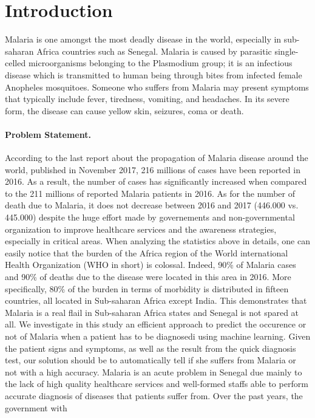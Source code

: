 \section{Introduction}\label{intro}
Malaria is one amongst the most deadly disease in the world, especially in sub-saharan Africa countries such as Senegal.
Malaria is caused by parasitic single-celled microorganisms belonging to the Plasmodium group; it is an infectious
disease which is transmitted to human being through bites from infected female Anopheles mosquitoes. Someone who suffers
from  Malaria may present symptoms that typically include fever, tiredness, vomiting, and headaches. In its severe form,
the disease can cause yellow skin, seizures, coma or death.
\paragraph*{Problem Statement.}
According to the last report about the propagation of Malaria disease around the world, published in November 2017, 216 millions of cases have been 
reported in 2016. As a result, the number of cases has significantly increased when compared to the 211 millions of reported Malaria patients in 2016.
As for the number of death due to Malaria, it does not decrease between 2016 and 2017 (446.000 vs. 445.000) despite the huge effort made by governements
and non-governmental organization to improve healthcare services and the awareness strategies, especially in critical areas. 
When analyzing the statistics above in details, one can easily notice that the burden of the Africa region of the World 
international Health Organization (WHO in short) is colossal. Indeed, 90\% of Malaria cases and 90\% of deaths due to the disease were located in this area in 2016.
More specifically, 80\% of the burden in terms of morbidity is distributed in fifteen countries, all located in Sub-saharan Africa except India. This demonstrates
that Malaria is a real flail in Sub-saharan Africa states and Senegal is not spared at all. We investigate in this study an efficient approach to predict the occurence 
or not of Malaria when a patient has to be diagnosedi using machine learning. Given the patient signs and symptoms, as well as the result from the quick diagnosis test, our solution should be to 
automatically tell if she suffers from Malaria or not with a high accuracy.
Malaria is an acute problem in Senegal  due mainly to the lack of high quality healthcare services and well-formed
staffs able to perform accurate diagnosis of diseases that patients suffer from. Over the past years, the government with 
